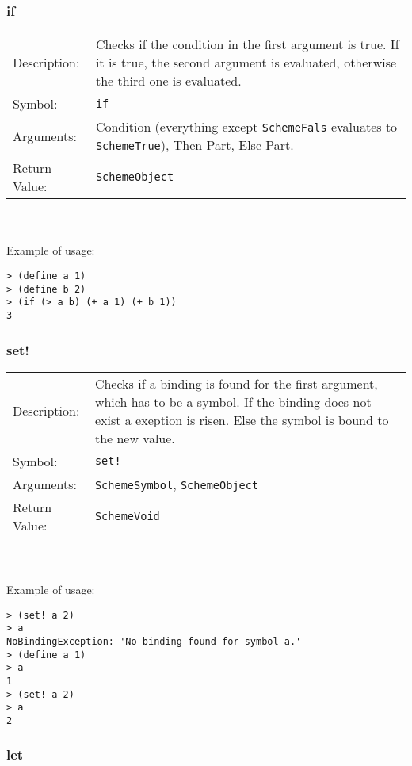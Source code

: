 \documentclass[12pt,a4paper]{scrartcl}
\begin{document}
\subsubsection{if}
\begin{tabular}{l  p{13cm}}
Description: & Checks if the condition in the first argument is true. If it is true, the second argument is evaluated, otherwise the third one is evaluated. \\
Symbol: & \lstinline{if}\\
Arguments: & Condition (everything except \lstinline{SchemeFals} evaluates to \lstinline{SchemeTrue}), Then-Part, Else-Part. \\
Return Value: & \lstinline{SchemeObject}\\
\end{tabular}
\\
\\
Example of usage:
\begin{lstlisting}
> (define a 1)
> (define b 2)
> (if (> a b) (+ a 1) (+ b 1))
3
\end{lstlisting}

\subsubsection{set!}
\begin{tabular}{l  p{13cm}}
Description: & Checks if a binding is found for the first argument, which has to be a symbol. If the binding does not exist a exeption is risen. Else the symbol is bound to the new value. \\
Symbol: & \lstinline{set!}\\
Arguments: & \lstinline{SchemeSymbol}, \lstinline{SchemeObject} \\
Return Value: & \lstinline{SchemeVoid}\\
\end{tabular}
\\
\\
Example of usage:
\begin{lstlisting}
> (set! a 2)
> a
NoBindingException: 'No binding found for symbol a.'
> (define a 1)
> a
1
> (set! a 2)
> a
2
\end{lstlisting}

\subsubsection{let}
\end{document}
